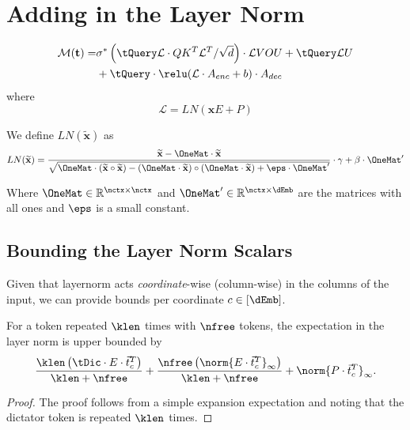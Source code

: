 
\section{Adding in the Layer Norm}
\begin{align*}
	\mathcal{M}(\textbf{t}) =& \sigma^* 
	       \left(\tQuery \mathcal{L} \cdot  Q K^T  \mathcal{L}^T /\sqrt{d} \right) \cdot \mathcal{L} VOU + \tQuery\mathcal{L} U\\
        &+ \tQuery \cdot \relu(\mathcal{L} \cdot A_{enc} + b) \cdot A_{dec}
\end{align*}
where
\[
    \mathcal{L} = LN(\mathbf{x} E + P)
\]
\newcommand{\tild}[1]{\widetilde{#1}}

\newcommand{\LNInp}{\tild{\mathbf{x}}}

We define $LN(\tild{\mathbf{x}})$ as 
\[
	LN(\LNInp) = \frac{\LNInp - \OneMat \cdot \LNInp}{\sqrt{\OneMat \cdot (\LNInp\circ\LNInp) - (\OneMat \cdot \LNInp) \circ (\OneMat \cdot \LNInp) + \eps \cdot \OneMat'}} \cdot \gamma + \beta \cdot \OneMat'
\]

Where $\OneMat \in \mathbb{R}^{\nctx \times \nctx}$ and $\OneMat' \in \mathbb{R}^{\nctx \times \dEmb}$ are the matrices with all ones and $\eps$ is a small constant.



\subsection{Bounding the Layer Norm Scalars}
Given that layernorm acts \emph{coordinate}-wise (column-wise) in the columns of the input, we can provide bounds per coordinate $c \in [\dEmb]$.

\begin{lemma}
	\label{lemma:upperExpBound}
	For a token repeated $\klen$ times with $\nfree$ tokens, the expectation in the layer norm is upper bounded by
	\[
		\frac{\klen \left(\tDic \cdot E \cdot \vec{t}_c^T\right)}{\klen + \nfree} +
			\frac{\nfree \left(\norm{E \cdot \vec{t}_c^T}_\infty\right)}{\klen + \nfree} + \norm{P \cdot \vec{t}_c^T}_\infty.
	\]	
\end{lemma}
\begin{proof}
	The proof follows from a simple expansion expectation and noting that the dictator token is repeated $\klen$ times.
\end{proof}

